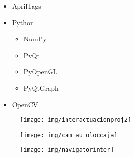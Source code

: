 \documentclass[notes,slidesec,a4]{seminar}
\begin{document}
\begin{hslide}

\begin{itemize}
\item AprilTags
\item Python
	\begin{itemize}
	\item NumPy
	\item PyQt
	\item PyOpenGL
	\item PyQtGraph
	\end{itemize}
\item OpenCV
\end{itemize}

\end{hslide}



\begin{hslide}

\begin{center}
	\begin{figure}
		\texttt{[image: img/interactuacionproj2]}
	\end{figure}
\end{center}

\end{hslide}



\begin{hslide}

\begin{center}
	\begin{figure}
		\centering
		\texttt{[image: img/cam\_autoloccaja]}
	\end{figure}
\end{center}

\end{hslide}



\begin{hslide}

\begin{center}
	\begin{figure}
		\centering
		\texttt{[image: img/navigatorinter]}
	\end{figure}
\end{center}

\end{hslide}
\end{document}
